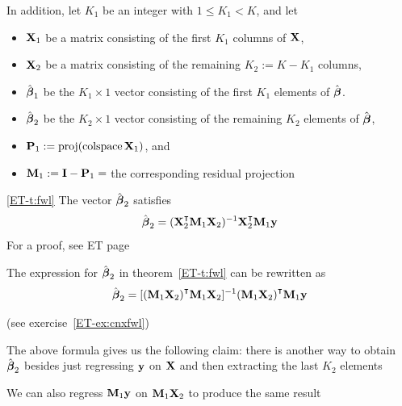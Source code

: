 \begin{frame}

    \vspace{2em}
    In addition, let $K_1$ be an integer with $1 \leq
    K_1 < K$, and let
    \begin{itemize}
        \item $\mathbf X_1$ be a matrix consisting of the first $K_1$ columns of
            $\mathbf X$,
        \item $\mathbf X_2$ be a matrix consisting of the remaining $K_2 := K - K_1$
            columns,
        \item $\hat {\boldsymbol \beta}_1$ be the $K_1 \times 1$ vector consisting of the first
            $K_1$ elements of $\hat {\boldsymbol \beta}$.
        \item $\hat {\boldsymbol \beta}_2$ be the $K_2 \times 1$ vector consisting of the
            remaining $K_2$ elements of $\hat {\boldsymbol \beta}$,
        \item $\mathbf P_1 := \operatorname{proj} ( \operatorname{colspace} \mathbf X_1)$, and
        \item $\mathbf M_1 := \mathbf I - \mathbf P_1 =$ the corresponding residual
            projection
    \end{itemize}
    
\end{frame}

\begin{frame}

    \vspace{2em}
    \eqref{ET-t:fwl}
    The vector $\hat {\boldsymbol \beta}_2$ satisfies
    \begin{equation*}
        \label{eq:fwle}
        \hboldbeta_2 
        = (\boldX_2^\T \boldM_1 \boldX_2)^{-1} \boldX_2^\T \boldM_1 \boldy
    \end{equation*}
    For a proof, see ET page \pageref{ET-t:fwl}
    
\end{frame}

\begin{frame}

    \vspace{2em}
    The expression for $\hat {\boldsymbol \beta}_2$ in theorem~\ref{ET-t:fwl} can be rewritten as
    \begin{equation}
        \label{eq:sxb2}
        \hboldbeta_2 
            = [(\boldM_1\boldX_2)^\T \boldM_1 \boldX_2]^{-1} (\boldM_1 \boldX_2)^\T \boldM_1 \boldy
    \end{equation}
    
    (see  exercise~\ref{ET-ex:cnxfwl})
    
    \vspace{.7em}
    The above formula gives us the following claim: there is
    another way to obtain $\hat {\boldsymbol \beta}_2$ besides just regressing ${\mathbf y}$ on
    $\mathbf X$ and then extracting the last $K_2$ elements
    
    We can also regress
    $\mathbf M_1 {\mathbf y}$ on $\mathbf M_1 \mathbf X_2$ to produce the same result

\end{frame}

